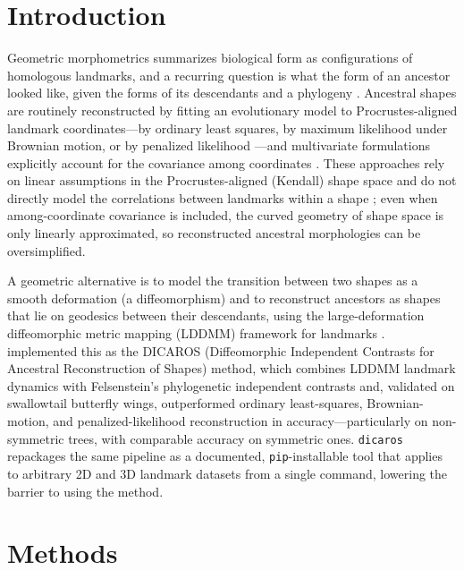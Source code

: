 \documentclass[twocolumn,10pt]{article}
\begin{document}
\section{Introduction}
Geometric morphometrics summarizes biological form as configurations of homologous landmarks, and a recurring question is what the form of an ancestor looked like, given the forms of its descendants and a phylogeny \citep{bookstein1991morphometric,adams2018phylomorphospace}. Ancestral shapes are routinely reconstructed by fitting an evolutionary model to Procrustes-aligned landmark coordinates---by ordinary least squares, by maximum likelihood under Brownian motion, or by penalized likelihood \citep{slater2012ancestral,adams2013geomorph,revell2012phytools}---and multivariate formulations explicitly account for the covariance among coordinates \citep{clavel2015mvmorph}. These approaches rely on linear assumptions in the Procrustes-aligned (Kendall) shape space and do not directly model the correlations between landmarks within a shape \citep{severinsen2026dicaros}; even when among-coordinate covariance is included, the curved geometry of shape space is only linearly approximated, so reconstructed ancestral morphologies can be oversimplified.

A geometric alternative is to model the transition between two shapes as a smooth deformation (a diffeomorphism) and to reconstruct ancestors as shapes that lie on geodesics between their descendants, using the large-deformation diffeomorphic metric mapping (LDDMM) framework for landmarks \citep{joshi2000landmark,younes2010shapes}. \citet{severinsen2026dicaros} implemented this as the DICAROS (Diffeomorphic Independent Contrasts for Ancestral Reconstruction of Shapes) method, which combines LDDMM landmark dynamics with Felsenstein's phylogenetic independent contrasts \citep{felsenstein1985} and, validated on swallowtail butterfly wings, outperformed ordinary least-squares, Brownian-motion, and penalized-likelihood reconstruction in accuracy---particularly on non-symmetric trees, with comparable accuracy on symmetric ones. \texttt{dicaros} repackages the same pipeline as a documented, \texttt{pip}-installable tool that applies to arbitrary 2D and 3D landmark datasets from a single command, lowering the barrier to using the method.

\section{Methods}
\end{document}
